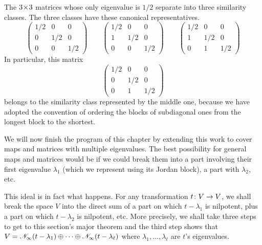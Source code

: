 \begin{example}
The \( 3 \! \times \! 3 \) matrices whose only eigenvalue is \( 1/2 \) separate into
three similarity classes.
The three classes have these canonical representatives.
\begin{equation*}
  \begin{pmatrix}
     1/2  &0    &0  \\
     0    &1/2  &0  \\
     0    &0    &1/2
   \end{pmatrix}
   \qquad 
   \begin{pmatrix}
     1/2  &0    &0  \\
     1    &1/2  &0  \\
     0    &0    &1/2
   \end{pmatrix}
   \qquad 
   \begin{pmatrix}
     1/2  &0    &0  \\
     1    &1/2  &0  \\
     0    &1    &1/2
   \end{pmatrix}
\end{equation*}
In particular, this matrix
\begin{equation*}
   \begin{pmatrix}
     1/2  &0    &0    \\
     0    &1/2  &0    \\
     0    &1    &1/2
   \end{pmatrix}
\end{equation*}
belongs to the similarity class represented by the middle one, because we have
adopted the convention of ordering the blocks of subdiagonal ones from the 
longest block to the shortest.
\end{example}

We will now finish the program of this chapter by extending this work to 
cover maps and matrices with multiple eigenvalues.
The best possibility for general maps and matrices would be
if we could break them into a part involving 
their first eigenvalue \( \lambda_1 \) 
(which we represent using its Jordan block),
a part with \( \lambda_2 \), etc.

This ideal is in fact what happens.
For any transformation \( \mbox{$t\colon V\to V$} \),
we shall break the space \( V \) into the direct sum of a part on which
\( t-\lambda_1 \) is nilpotent, plus a part on which \( t-\lambda_2 \)
is nilpotent, etc.
More precisely, we shall take three steps to get to this section's major
theorem and the third step shows that
\( V=\mathscr{N}_\infty(t-\lambda_1)\oplus\cdots\oplus
       \mathscr{N}_\infty(t-\lambda_\ell) \)
where \( \lambda_1,\ldots,\lambda_\ell \) are \( t \)'s eigenvalues.


